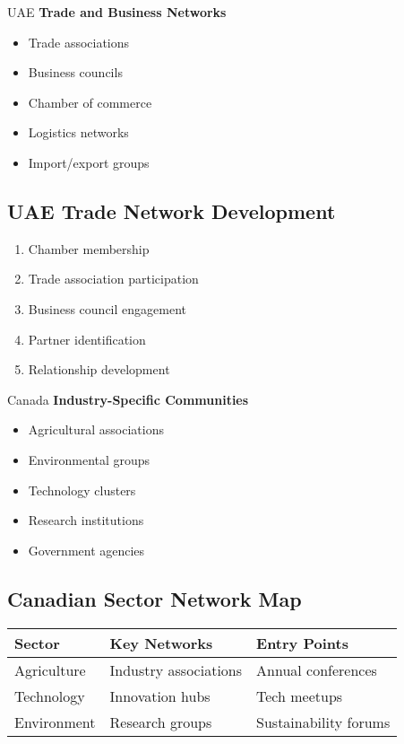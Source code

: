 \begin{regionalbox}{UAE}
\textbf{Trade and Business Networks}
\begin{itemize}
    \item Trade associations
    \item Business councils
    \item Chamber of commerce
    \item Logistics networks
    \item Import/export groups
\end{itemize}

\subsection{UAE Trade Network Development}
\begin{tcolorbox}[colback=white,colframe=primary,title=\textbf{Network Building Steps}]
\begin{enumerate}
    \item Chamber membership
    \item Trade association participation
    \item Business council engagement
    \item Partner identification
    \item Relationship development
\end{enumerate}
\end{tcolorbox}
\end{regionalbox}

\begin{regionalbox}{Canada}
\textbf{Industry-Specific Communities}
\begin{itemize}
    \item Agricultural associations
    \item Environmental groups
    \item Technology clusters
    \item Research institutions
    \item Government agencies
\end{itemize}

\subsection{Canadian Sector Network Map}
\begin{center}
\begin{tabularx}{\textwidth}{>{\raggedright\arraybackslash}X >{\raggedright\arraybackslash}X >{\raggedright\arraybackslash}X}
    \toprule
    \textbf{Sector} & \textbf{Key Networks} & \textbf{Entry Points} \\
    \midrule
    Agriculture & Industry associations & Annual conferences \\
    Technology & Innovation hubs & Tech meetups \\
    Environment & Research groups & Sustainability forums \\
    \bottomrule
\end{tabularx}
\end{center}
\end{regionalbox}

